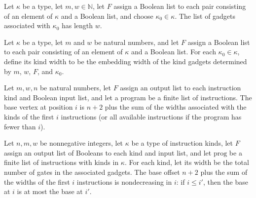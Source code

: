 \begin{theorem}
\label{BoolCircuit.length_kindGadgets}
\leanok
{}
Let $\kappa$ be a type, let $m,w\in\mathbb{N}$, let $F$ assign a Boolean list to each
pair consisting of an element of $\kappa$ and a Boolean list, and choose
$\kappa_0\in\kappa$. The list of gadgets associated with $\kappa_0$ has length $w$.
\end{theorem}

\begin{definition}
\label{BoolCircuit.kindWidth}
\leanok
{}
Let $\kappa$ be a type, let $m$ and $w$ be natural numbers, and let $F$ assign a Boolean
list to each pair consisting of an element of $\kappa$ and a Boolean list. For each
$\kappa_0\in\kappa$, define its kind width to be the embedding width of the kind gadgets
determined by $m$, $w$, $F$, and $\kappa_0$.
\end{definition}

\begin{definition}
\label{BoolCircuit.progBase}
\leanok
{}
Let $m,w,n$ be natural numbers, let $F$ assign an output list to each instruction kind
and Boolean input list, and let a program be a finite list of instructions. The base
vertex at position $i$ is $n+2$ plus the sum of the widths associated with the kinds of
the first $i$ instructions (or all available instructions if the program has fewer than
$i$).
\end{definition}

\begin{theorem}
\label{BoolCircuit.progBase_mono}
\leanok
{}
Let $n,m,w$ be nonnegative integers, let $\kappa$ be a type of instruction kinds, let
$F$ assign an output list of Booleans to each kind and input list, and let
$\mathrm{prog}$ be a finite list of instructions with kinds in $\kappa$. For each kind,
let its width be the total number of gates in the associated gadgets. The base offset
$n+2$ plus the sum of the widths of the first $i$ instructions is nondecreasing in $i$:
if $i\le i'$, then the base at $i$ is at most the base at $i'$.
\end{theorem}

